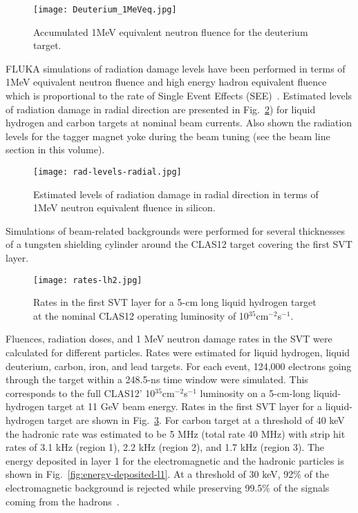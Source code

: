\begin{figure}[hbt] 
\centering 
\texttt{[image: Deuterium\_1MeVeq.jpg]}
\caption{Accumulated 1MeV equivalent neutron fluence for the deuterium target.}
\label{fig:fluka2}
\end{figure}

FLUKA simulations of radiation damage levels have been performed in terms of 1MeV equivalent neutron fluence and high energy hadron equivalent fluence which is proportional to the rate of Single Event Effects (SEE)~\cite{FLUKA3}. Estimated levels of radiation damage in radial direction are presented in Fig.~\ref{fig:rad-levels-radial}) for liquid hydrogen and carbon targets at nominal beam currents. Also shown the radiation levels for the tagger magnet yoke during the beam tuning (see the beam line section in this volume).

\begin{figure}[hbt] 
\centering 
\texttt{[image: rad-levels-radial.jpg]}
\caption{Estimated levels of radiation damage in radial direction in terms of 1MeV neutron equivalent fluence in silicon.}
\label{fig:rad-levels-radial}
\end{figure}

Simulations of beam-related backgrounds were performed for several thicknesses of a tungsten shielding cylinder around the CLAS12 target covering the first SVT layer. 
 
\begin{figure}[hbt] 
\centering 
\texttt{[image: rates-lh2.jpg]}
\caption{Rates in the first SVT layer for a 5-cm long liquid hydrogen target at the nominal CLAS12 operating luminosity of 10$^{35}$cm$^{-2}$s$^{-1}$.}
\label{fig:rates-lh2}
\end{figure}

Fluences, radiation doses, and 1 MeV neutron damage rates in the SVT were calculated for different particles. Rates were estimated for liquid hydrogen, liquid deuterium, carbon, iron, and lead targets. For each event, 124,000 electrons going through the target within a 248.5-ns time window were simulated. This corresponds to the full CLAS12' 10$^{35}$cm$^{-2}$s$^{-1}$ luminosity on a 5-cm-long liquid-hydrogen target at 11 GeV beam energy. Rates in the first SVT layer for a liquid-hydrogen target are shown in Fig.~\ref{fig:rates-lh2}. For carbon target at a threshold of 40 keV the hadronic rate was estimated to be 5 MHz (total rate 40 MHz) with strip hit rates of 3.1 kHz (region 1), 2.2 kHz (region 2), and 1.7 kHz (region 3). The energy deposited in layer 1 for the electromagnetic and the hadronic particles is shown in Fig.~\ref{fig:energy-deposited-l1}. At a threshold of 30 keV, 92$\%$ of the electromagnetic background is rejected while preserving  99.5$\%$ of the signals coming from the hadrons~\cite{TDRSVT}.

